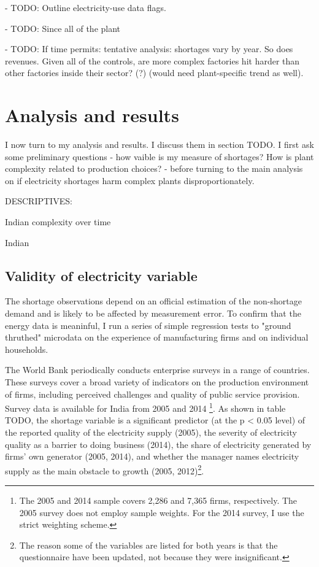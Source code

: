 \documentclass[11pt]{article}
\begin{document}
- TODO: Outline electricity-use data flags.

- TODO: Since all of the plant

- TODO: If time permits: tentative analysis: shortages vary by year. So does revenues. Given all of the controls, are more complex factories hit harder than other factories inside their sector? (?) (would need plant-specific trend as well).


\newpage

\section{Analysis and results}%
\label{sec:analysis_and_results}

I now turn to my analysis and results. I discuss them in section TODO. I first ask some preliminary questions - how vaible is my measure of shortages? How is plant complexity related to production choices? - before turning to the main analysis on if electricity shortages harm complex plants disproportionately. 

DESCRIPTIVES:

Indian complexity over time



Indian 



\subsection{Validity of electricity variable}%
\label{sub:validity_of_electricity_variable}

The shortage observations depend on an official estimation of the non-shortage demand and is likely to be affected by measurement error. To confirm that the energy data is meaninful, I run a series of simple regression tests to "ground thruthed" microdata on the experience of manufacturing firms and on individual households. 

The World Bank periodically conducts enterprise surveys in a range of countries. These surveys cover a broad variety of indicators on the production environment of firms, including perceived challenges and quality of public service provision. Survey data is available for India from 2005 and 2014 \citep{the_world_bank_enterprise_2020-1,the_world_bank_enterprise_2020-2}\footnote{The 2005 and 2014 sample covers 2,286 and 7,365 firms, respectively. The 2005 survey does not employ sample weights. For the 2014 survey, I use the strict weighting scheme.}. As shown in table TODO, the shortage variable is a significant predictor (at the p < 0.05 level) of the reported quality of the electricity supply (2005), the severity of electricity quality as a barrier to doing business (2014), the share of electricity generated by firms' own generator (2005, 2014), and whether the manager names electricity supply as the main obstacle to growth (2005, 2012)\footnote{The reason some of the variables are listed for both years is that the questionnaire have been updated, not because they were insignificant.}.
\end{document}
